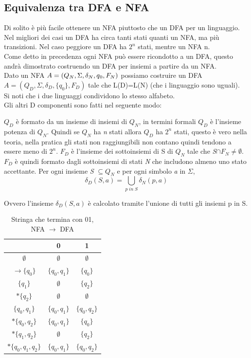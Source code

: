 \documentclass[12pt]{article}
\begin{document}
\subsection{Equivalenza tra DFA e NFA}
Di solito è più facile ottenere un NFA piuttosto che un DFA per un linguaggio. Nel migliori dei casi un DFA ha circa tanti stati quanti un NFA, ma più transizioni. Nel caso peggiore un DFA ha $2^n$ stati, mentre un NFA n.
\\ Come detto in precedenza ogni NFA può essere ricondotto a un DFA, questo andrà dimostrato costruendo un DFA per insiemi a partire da un NFA. 
\\ Dato un NFA $A = (Q_N, \Sigma, \delta_N, q\textsubscript{0}, F_N)$ possiamo costruire un DFA \\ $A = (Q_D, \Sigma, \delta_D, \{q_0\}, F_D)$ tale che L(D)=L(N) (che i linguaggio sono uguali).
\\ Si noti che i due linguaggi condividono lo stesso alfabeto.
\\ Gli altri D componenti sono fatti nel seguente modo: 
\begin{outline}
  \1 $Q_D$ è formato da un insieme di insiemi di $Q_N$, in termini formali $Q_D$ è l'insieme potenza di $Q_N$. Quindi se $Q_N$ ha \emph{n} stati allora $Q_D$ ha $2^n$ stati, questo è vero nella teoria, nella pratica gli stati non raggiungibili non contano quindi tendono a essere meno di $2^n$.
  \1 $F_D$ è l'insieme dei sottoinsiemi di S di $Q_N$ tale che \emph{S}$ \cap F_N \ne \emptyset$. $F_D$ è quindi formato dagli sottoinsiemi di stati \emph{N} che includono almeno uno stato accettante.
  \1 Per ogni insieme \emph{S} $\subseteq Q_N$ e per ogni simbolo \emph{a} in $\Sigma$, 
  \[\delta_D(S,a) = \bigcup_{p\;in\;S} \delta_N(p,a)\]
\end{outline}
  Ovvero l'insieme $\delta_D(S,a)$ è calcolato tramite l'unione di tutti gli insiemi p in S.
\begin{table}[ht]
\centering
\begin{tabular}{c || c | c}
& 0 & 1 \\
\hline \hline
  $ \emptyset $ & $ \emptyset $ & $ \emptyset $ \\
  $ \rightarrow \{q_0\} $ & $ \{q_0, q_1\} $ & $ \{q_0\} $ \\
  $ \{q_1\} $ & $ \emptyset $ & $ \{q_2\} $ \\
  $ *\{q_2\} $ & $ \emptyset $ & $ \emptyset $ \\
  $ \{q_0,q_1\} $ & $  \{q_0, q_1\} $ & $ \{q_0,q_2\} $ \\
  $ *\{q_0,q_2\} $ & $ \{q_0, q_1\} $ & $ \{q_0\} $ \\
  $ *\{q_1,q_2\} $ & $ \emptyset $ & $ \{q_2\} $ \\
  $ *\{q_0, q_1, q_2\} $ & $ \{q_0,q_1\} $ & $ \{q_0,q_2\} $ \\
\end{tabular}
\caption{Stringa che termina con 01, NFA $\rightarrow$ DFA}
\end{table}
\end{document}
